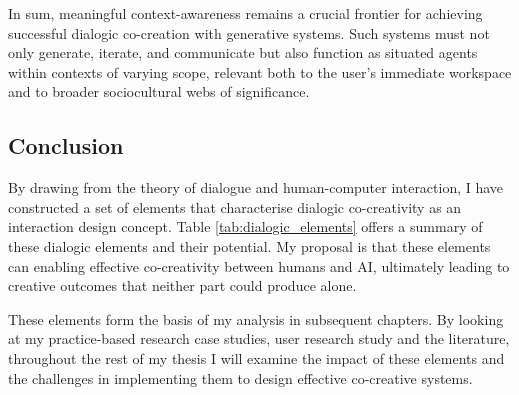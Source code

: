 In sum, meaningful context-awareness remains a crucial frontier for achieving successful dialogic co-creation with generative systems. Such systems must not only generate, iterate, and communicate but also function as situated agents within contexts of varying scope, relevant both to the user’s immediate workspace and to broader sociocultural webs of significance.

\subsection{Conclusion}

By drawing from the theory of dialogue and human-computer interaction, I have constructed a set of elements that characterise dialogic co-creativity as an interaction design concept. Table \ref{tab:dialogic_elements} offers a summary of these dialogic elements and their potential.  My proposal is that these elements can enabling effective co-creativity between humans and AI, ultimately leading to creative outcomes that neither part could produce alone. 

These elements form the basis of my analysis in subsequent chapters. By looking at my practice-based research case studies, user research study and the literature, throughout the rest of my thesis I will examine the impact of these elements and the challenges in implementing them to design effective co-creative systems.  

